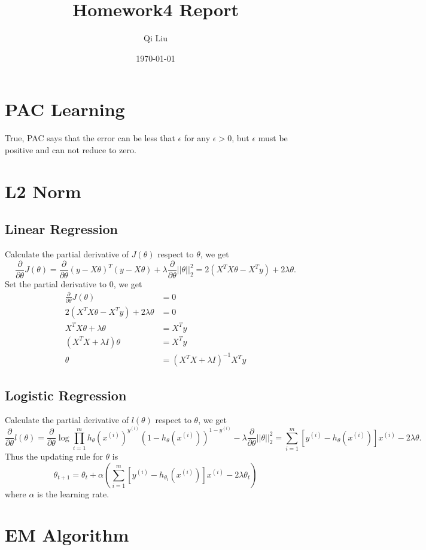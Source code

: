 \documentclass{article}
\title{Homework4 Report}
\author{Qi Liu}
\date{\today}
\begin{document}
\maketitle

\section{PAC Learning}
True, PAC says that the error can be less that $\epsilon$ for any $\epsilon>0$, but $\epsilon$ must be positive and can not reduce to zero.

\section{L2 Norm}

\subsection{Linear Regression}
Calculate the partial derivative of $J(\theta)$ respect to $\theta$, we get
$$\frac{\partial}{\partial\theta}J(\theta)= \frac{\partial}{\partial\theta}(y-X\theta)^T(y-X\theta)+ \lambda\frac{\partial}{\partial\theta}||\theta||^2_2= 2(X^TX\theta-X^Ty)+2\lambda\theta.$$ Set the partial derivative to 0, we get 
\begin{align*}
\frac{\partial}{\partial\theta}J(\theta)&=0 \\
2(X^TX\theta-X^Ty)+2\lambda\theta&=0 \\
X^TX\theta+\lambda\theta&=X^Ty \\
(X^TX+\lambda I)\theta&=X^Ty \\
\theta&=(X^TX+\lambda I)^{-1}X^Ty
\end{align*}

\subsection{Logistic Regression}
Calculate the partial derivative of $l(\theta)$ respect to $\theta$, we get
$$\frac{\partial}{\partial\theta}l(\theta)=\frac{\partial}{\partial\theta} \log\prod_{i=1}^mh_\theta(x^{(i)})^{y^{(i)}}(1-h_\theta(x^{(i)}))^{1-y^{(i)}}- \lambda\frac{\partial}{\partial\theta}||\theta||^2_2=\sum_{i=1}^m[y^{(i)}- h_\theta(x^{(i)})]x^{(i)}-2\lambda\theta.$$ Thus the updating rule for $\theta$ is $$\theta_{t+1}=\theta_{t}+\alpha(\sum_{i=1}^m[y^{(i)}- h_{\theta_t}(x^{(i)})]x^{(i)}-2\lambda\theta_t)$$ where $\alpha$ is the learning rate.

\section{EM Algorithm}
\end{document}
